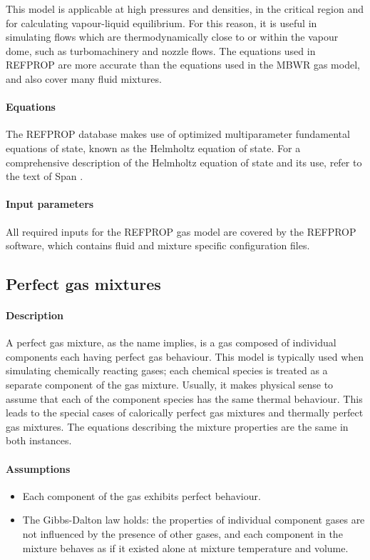 This model is applicable at high pressures and densities, in the critical region and
for calculating vapour-liquid equilibrium. For this reason, it is useful in
simulating flows which are thermodynamically close to or within the vapour dome,
such as turbomachinery and nozzle flows. The equations used in REFPROP are
more accurate than the equations used in the MBWR gas model, and also cover
many fluid mixtures.

\paragraph{Equations}
The REFPROP database makes use of optimized multiparameter fundamental equations
of state, known as the Helmholtz equation of state. For a comprehensive description of
the Helmholtz equation of state and its use, refer to the text of Span \cite{span2000multiparameter}.

\paragraph{Input parameters}
All required inputs for the REFPROP gas model are covered by the REFPROP software,
which contains fluid and mixture specific configuration files.

\subsection{Perfect gas mixtures}
\label{sec:pgm}
\paragraph{Description}
A perfect gas mixture, as the name implies, is a gas composed
of individual components each having perfect gas behaviour.
This model is typically used when simulating chemically
reacting gases; each chemical species is treated as a separate
component of the gas mixture.
Usually, it makes physical sense to assume that each of the component species
has the same thermal behaviour.
This leads to the special cases of calorically perfect gas mixtures and
thermally perfect gas mixtures.
The equations describing the mixture properties are the same in both
instances. 

\paragraph{Assumptions}
\begin{itemize}
\item Each component of the gas exhibits perfect behaviour.
\item The Gibbs-Dalton law holds: the properties of individual
      component gases are not influenced by the presence of
      other gases, and each component in the mixture behaves
      as if it existed alone at mixture temperature and volume.
\end{itemize}

